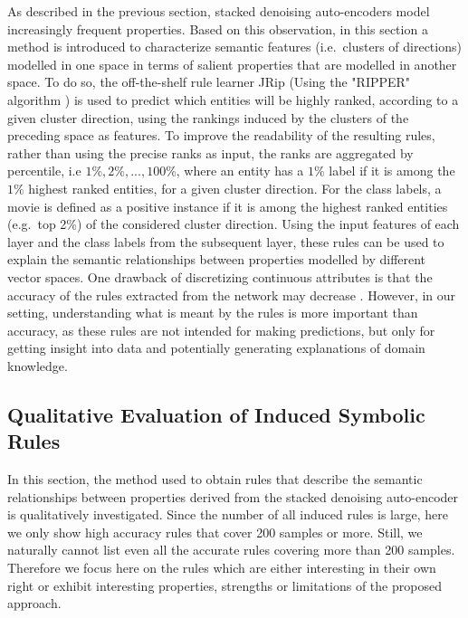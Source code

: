 As described in the previous section, stacked denoising auto-encoders model increasingly frequent properties. Based on this observation, in this section a method is introduced  to characterize semantic features (i.e.\ clusters of directions)  modelled in one space  in terms of salient properties that are modelled in another space. To do so, the off-the-shelf rule learner JRip (Using the "RIPPER" algorithm \cite{Cohen1995})  is used to predict which entities will be highly ranked, according to a given cluster direction, using the rankings induced by the clusters of the preceding space   as features. To improve the readability of the resulting rules, rather than using the precise ranks as input, the ranks are aggregated by percentile, i.e $1\%, 2\%, ..., 100\%$, where an entity has a $1\%$ label if it is among the $1\%$ highest ranked entities, for a given cluster direction. For the class labels,  a movie is defined as a positive instance if it is among the highest ranked entities (e.g.\ top 2\%) of the considered cluster direction. Using the input features of each layer and the class labels  from the subsequent layer, these rules can be used to explain the semantic relationships between properties modelled by different vector spaces. One drawback of discretizing continuous attributes is that the accuracy of the rules extracted from the network may decrease \cite{Setiono2008a}.  However, in our setting, understanding what is meant by the rules is more important than accuracy, as  these rules are not intended for making predictions, but only for getting insight into data and potentially  generating explanations of domain knowledge.


\subsection{Qualitative Evaluation of Induced Symbolic Rules}

In this section, the method used to obtain rules that describe the semantic relationships between properties derived from the stacked denoising auto-encoder is qualitatively investigated. Since the number of all induced rules is large, here we only show high accuracy rules that cover 200 samples or more.  Still, we naturally cannot list even all the accurate rules covering more than 200 samples. Therefore we focus here on the rules which are either interesting in their own right or exhibit interesting properties, strengths or limitations of the proposed approach. 

